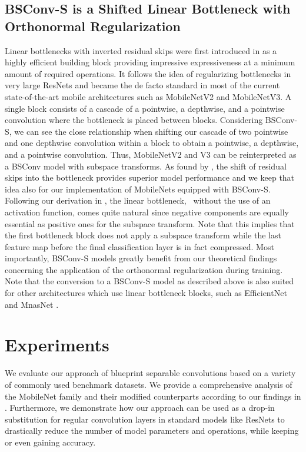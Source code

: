 \documentclass[10pt,twocolumn,letterpaper]{article}
\newcommand{\DCCK}{BSConv\xspace}
\newcommand{\DCCKS}{\DCCK-S\xspace}
\begin{document}
\subsection{\DCCKS is a Shifted Linear Bottleneck with Orthonormal Regularization}
\label{sec:dcck:mobilenets:dcck-s}
Linear bottlenecks with inverted residual skips were first introduced in \cite{sandler2018mobilenetv2} as a highly efficient building block providing impressive expressiveness at a minimum amount of required operations.
It follows the idea of regularizing bottlenecks in very large ResNets and became the de facto standard in most of the current state-of-the-art mobile architectures such as MobileNetV2 and MobileNetV3.
A single block consists of a cascade of a pointwise, a depthwise, and a pointwise convolution where the bottleneck is placed between blocks.
Considering \DCCKS, we can see the close relationship when shifting our cascade of two pointwise and one depthwise convolution within a block to obtain a pointwise, a depthwise, and a pointwise convolution.
Thus, MobileNetV2 and V3 can be reinterpreted as a \DCCK model with subspace transforms.
As found by \cite{sandler2018mobilenetv2}, the shift of residual skips into the bottleneck provides superior model performance and we keep that idea also for our implementation of MobileNets equipped with \mbox{\DCCKS}.
Following our derivation in , the linear bottleneck, \ie\ without the use of an activation function, comes quite natural since negative components are equally essential as positive ones for the subspace transform.
Note that this implies that the first bottleneck block does not apply a subspace transform while the last feature map before the final classification layer is in fact compressed.
Most importantly, \DCCKS models greatly benefit from our theoretical findings concerning the application of the orthonormal regularization during training.
Note that the conversion to a \DCCKS model as described above is also suited for other architectures which use linear bottleneck blocks, such as EfficientNet \cite{tan2019efficientnet} and MnasNet \cite{tan2019mnasnet}.



\section{Experiments}
\label{sec:experiments}
We evaluate our approach of blueprint separable convolutions based on a variety of commonly used benchmark datasets.
We provide a comprehensive analysis of the \mbox{MobileNet} family and their modified counterparts according to our findings in .
Furthermore, we demonstrate how our approach can be used as a drop-in substitution for regular convolution layers in standard models like ResNets to drastically reduce the number of model parameters and operations, while keeping or even gaining accuracy.
\end{document}
